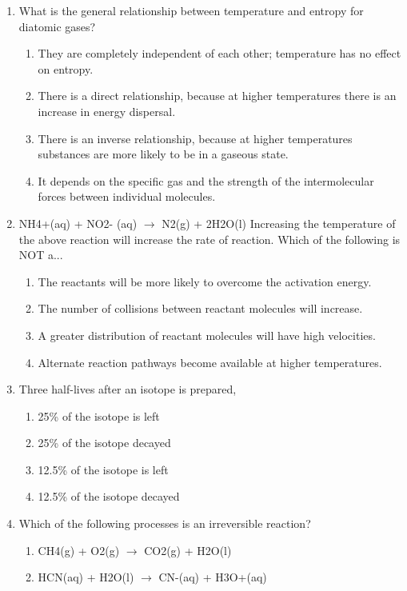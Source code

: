 \documentclass[12pt]{article}
\begin{document}
\begin{enumerate}[label=\arabic*.]
\item What is the general relationship between temperature and entropy for diatomic gases?
\begin{enumerate}[label=(\alph*)]
    \item They are completely independent of each other; temperature has no effect on entropy.
    \item There is a direct relationship, because at higher temperatures there is an increase in energy dispersal.
    \item There is an inverse relationship, because at higher temperatures substances are more likely to be in a gaseous state.
    \item It depends on the specific gas and the strength of the intermolecular forces between individual molecules.
\end{enumerate}
\item NH4+(aq) + NO2- (aq) $\rightarrow$ N2(g) + 2H2O(l) Increasing the temperature of the above reaction will increase the rate of reaction. Which of the following is NOT a...
\begin{enumerate}[label=(\alph*)]
    \item The reactants will be more likely to overcome the activation energy.
    \item The number of collisions between reactant molecules will increase.
    \item A greater distribution of reactant molecules will have high velocities.
    \item Alternate reaction pathways become available at higher temperatures.
\end{enumerate}
\item Three half-lives after an isotope is prepared,
\begin{enumerate}[label=(\alph*)]
    \item 25\% of the isotope is left
    \item 25\% of the isotope decayed
    \item 12.5\% of the isotope is left
    \item 12.5\% of the isotope decayed
\end{enumerate}
\item Which of the following processes is an irreversible reaction?
\begin{enumerate}[label=(\alph*)]
    \item CH4(g) + O2(g) $\rightarrow$ CO2(g) + H2O(l)
    \item HCN(aq) + H2O(l) $\rightarrow$ CN-(aq) + H3O+(aq)

\end{enumerate}
\end{enumerate}
\end{document}
